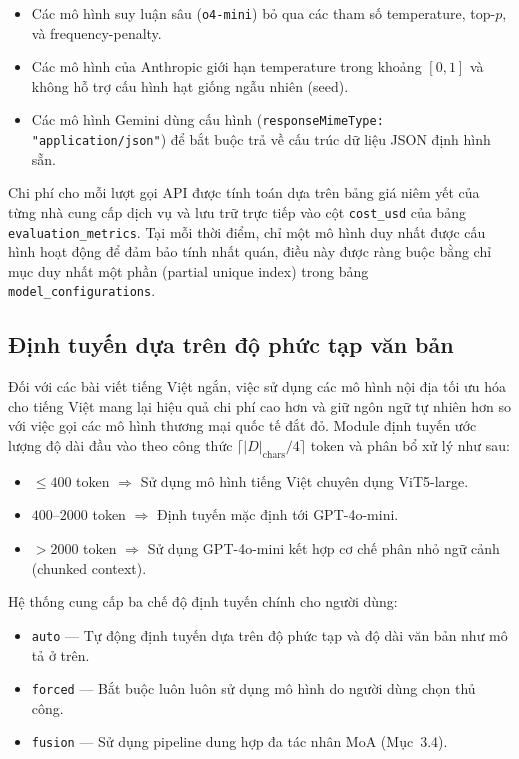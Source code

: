 \begin{itemize}
  \item Các mô hình suy luận sâu (\texttt{o4-mini}) bỏ qua các tham số temperature, top-$p$, và frequency-penalty.
  \item Các mô hình của Anthropic giới hạn temperature trong khoảng $[0, 1]$ và không hỗ trợ cấu hình hạt giống ngẫu nhiên (seed).
  \item Các mô hình Gemini dùng cấu hình (\texttt{response}\allowbreak\texttt{MimeType:}\allowbreak{} \texttt{"application/}\allowbreak\texttt{json"}) để bắt buộc trả về cấu trúc dữ liệu JSON định hình sẵn.
\end{itemize}

Chi phí cho mỗi lượt gọi API được tính toán dựa trên bảng giá niêm yết của từng nhà cung cấp dịch vụ và lưu trữ trực tiếp vào cột \texttt{cost\_usd} của bảng \texttt{evaluation\_metrics}. 
Tại mỗi thời điểm, chỉ một mô hình duy nhất được cấu hình hoạt động để đảm bảo tính nhất quán, điều này được ràng buộc bằng chỉ mục duy nhất một phần (partial unique index) trong bảng \texttt{model\_configurations}.

\subsection{Định tuyến dựa trên độ phức tạp văn bản}

Đối với các bài viết tiếng Việt ngắn, việc sử dụng các mô hình nội địa tối ưu hóa cho tiếng Việt mang lại hiệu quả chi phí cao hơn và giữ ngôn ngữ tự nhiên hơn so với việc gọi các mô hình thương mại quốc tế đắt đỏ. 
Module định tuyến ước lượng độ dài đầu vào theo công thức $\lceil |D|_{\text{chars}} / 4 \rceil$ token và phân bổ xử lý như sau:

\begin{itemize}
  \item $\leq 400$ token $\Rightarrow$ Sử dụng mô hình tiếng Việt chuyên dụng ViT5-large.
  \item $400$--$2000$ token $\Rightarrow$ Định tuyến mặc định tới GPT-4o-mini.
  \item $> 2000$ token $\Rightarrow$ Sử dụng GPT-4o-mini kết hợp cơ chế phân nhỏ ngữ cảnh (chunked context).
\end{itemize}

Hệ thống cung cấp ba chế độ định tuyến chính cho người dùng:

\begin{itemize}
  \item \texttt{auto} --- Tự động định tuyến dựa trên độ phức tạp và độ dài văn bản như mô tả ở trên.
  \item \texttt{forced} --- Bắt buộc luôn luôn sử dụng mô hình do người dùng chọn thủ công.
  \item \texttt{fusion} --- Sử dụng pipeline dung hợp đa tác nhân MoA (Mục~3.4).
\end{itemize}

